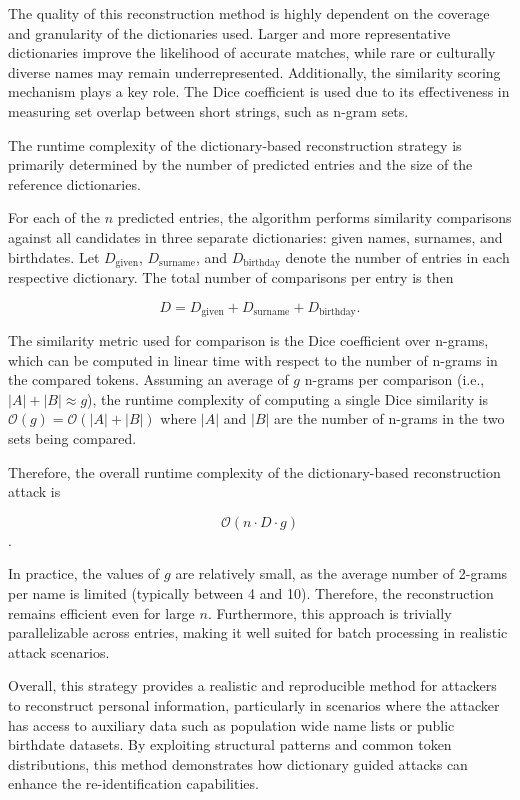 The quality of this reconstruction method is highly dependent on the coverage and granularity of the dictionaries used.
Larger and more representative dictionaries improve the likelihood of accurate matches, while rare or culturally diverse names may remain underrepresented.
Additionally, the similarity scoring mechanism plays a key role.
The Dice coefficient is used due to its effectiveness in measuring set overlap between short strings, such as n-gram sets.

The runtime complexity of the dictionary-based reconstruction strategy is primarily determined by the number of predicted entries and the size of the reference dictionaries.

For each of the \( n \) predicted entries, the algorithm performs similarity comparisons against all candidates in three separate dictionaries: given names, surnames, and birthdates. Let \( D_{\text{given}} \), \( D_{\text{surname}} \), and \( D_{\text{birthday}} \) denote the number of entries in each respective dictionary. The total number of comparisons per entry is then

\[
D = D_{\text{given}} + D_{\text{surname}} + D_{\text{birthday}}.
\]

The similarity metric used for comparison is the Dice coefficient over n-grams, which can be computed in linear time with respect to the number of n-grams in the compared tokens.
Assuming an average of \( g \) n-grams per comparison (i.e., \( |A| + |B| \approx g \)), the runtime complexity of computing a single Dice similarity is \( \mathcal{O}(g) = \mathcal{O}(|A| + |B|) \) where \( |A| \) and \( |B| \) are the number of n-grams in the two sets being compared.


Therefore, the overall runtime complexity of the dictionary-based reconstruction attack is

\[
\mathcal{O}(n \cdot D \cdot g)
\].


In practice, the values of $g$ are relatively small, as the average number of 2-grams per name is limited (typically between 4 and 10). Therefore, the reconstruction remains efficient even for large $n$. Furthermore, this approach is trivially parallelizable across entries, making it well suited for batch processing in realistic attack scenarios.


Overall, this strategy provides a realistic and reproducible method for attackers to reconstruct personal information, particularly in scenarios where the attacker has access to auxiliary data such as population wide name lists or public birthdate datasets.
By exploiting structural patterns and common token distributions, this method demonstrates how dictionary guided attacks can enhance the re-identification capabilities.

